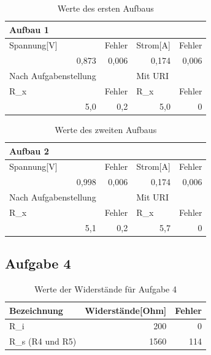 \documentclass[12pt]{scrartcl}
\begin{document}
\begin{table}[htbp]
\caption{Werte des ersten Aufbaus}
\centering
\begin{tabular}{|l|l|l|l|}
\hline
Aufbau 1 &  &  &  \\ \hline
Spannung[V] & Fehler & Strom[A] & Fehler \\ \hline
\multicolumn{1}{|r|}{0,873} & \multicolumn{1}{r|}{0,006} & \multicolumn{1}{r|}{0,174} & \multicolumn{1}{r|}{0,006} \\ \hline
Nach Aufgabenstellung &  & Mit URI &  \\ \hline
R\_x & Fehler & R\_x & Fehler \\ \hline
\multicolumn{1}{|r|}{5,0} & \multicolumn{1}{r|}{0,2} & \multicolumn{1}{r|}{5,0} & \multicolumn{1}{r|}{0} \\ \hline
\end{tabular}
\label{aufgabe_3_aufbau_1}
\end{table}

\begin{table}[htbp]
\caption{Werte des zweiten Aufbaus}
\centering
\begin{tabular}{|l|l|l|l|}
\hline
Aufbau 2 &  &  &  \\ \hline
Spannung[V] & Fehler & Strom[A] & Fehler \\ \hline
\multicolumn{1}{|r|}{0,998} & \multicolumn{1}{r|}{0,006} & \multicolumn{1}{r|}{0,174} & \multicolumn{1}{r|}{0,006} \\ \hline
Nach Aufgabenstellung &  & Mit URI &  \\ \hline
R\_x & Fehler & R\_x & Fehler \\ \hline
\multicolumn{1}{|r|}{5,1} & \multicolumn{1}{r|}{0,2} & \multicolumn{1}{r|}{5,7} & \multicolumn{1}{r|}{0} \\ \hline
\end{tabular}
\label{aufgabe_3_aufbau_2}
\end{table}

\newpage

\subsection{Aufgabe 4}

\begin{table}[htbp]
\caption{Werte der Widerstände für Aufgabe 4}
\centering
\begin{tabular}{|l|r|r|}
\hline
Bezeichnung & \multicolumn{1}{l|}{Widerstände[Ohm]} & \multicolumn{1}{l|}{Fehler} \\ \hline
R\_i & 200 & 0 \\ \hline
R\_s (R4 und R5) & 1560 & 114 \\ \hline
\end{tabular}
\label{aufgabe_4_widerstände}
\end{table}
\end{document}
